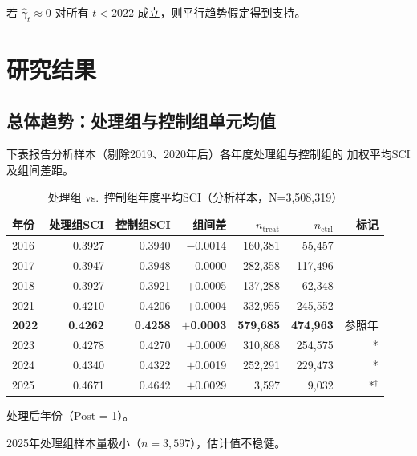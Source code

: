 \documentclass[12pt,a4paper]{ctexart}
\begin{document}
若 $\hat{\gamma}_t \approx 0$ 对所有 $t < 2022$ 成立，则平行趋势假定得到支持。

\section{研究结果}

\subsection{总体趋势：处理组与控制组单元均值}

下表报告分析样本（剔除2019、2020年后）各年度处理组与控制组的
加权平均SCI及组间差距。

\begin{table}[H]
\centering
\caption{处理组 vs.\ 控制组年度平均SCI（分析样本，N=3,508,319）}
\begin{threeparttable}
\begin{tabular}{lrrrrrr}
\toprule
年份 & 处理组SCI & 控制组SCI & 组间差 & $n_{\text{treat}}$ & $n_{\text{ctrl}}$ & 标记 \\
\midrule
2016 & 0.3927 & 0.3940 & $-$0.0014 & 160,381 & 55,457 & \\
2017 & 0.3947 & 0.3948 & $-$0.0000 & 282,358 & 117,496 & \\
2018 & 0.3927 & 0.3921 & $+$0.0005 & 137,288 & 62,348 & \\
2021 & 0.4210 & 0.4206 & $+$0.0004 & 332,955 & 245,552 & \\
\textbf{2022} & \textbf{0.4262} & \textbf{0.4258} & $+$\textbf{0.0003} & \textbf{579,685} & \textbf{474,963} & 参照年 \\
2023 & 0.4278 & 0.4270 & $+$0.0009 & 310,868 & 254,575 & * \\
2024 & 0.4340 & 0.4322 & $+$0.0019 & 252,291 & 229,473 & * \\
2025 & 0.4671 & 0.4642 & $+$0.0029 & 3,597 & 9,032 & *$^\dagger$ \\
\bottomrule
\end{tabular}
\begin{tablenotes}
\small
\item[*] 处理后年份（Post = 1）。
\item[$\dagger$] 2025年处理组样本量极小（$n=3{,}597$），估计值不稳健。
\end{tablenotes}
\end{threeparttable}
\end{table}
\end{document}
